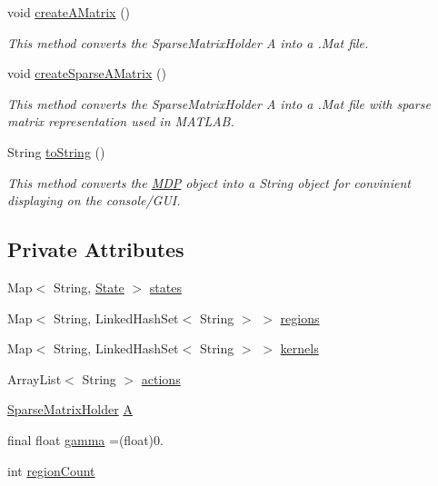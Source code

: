 \begin{DoxyCompactItemize}
void \hyperlink{classmdp_1_1core_1_1_m_d_p_aab4fc6ad8c299f88d6619cfd059b3931}{create\+A\+Matrix} ()
\begin{DoxyCompactList}\small\item\em This method converts the Sparse\+Matrix\+Holder A into a .Mat file. \end{DoxyCompactList}\item 
void \hyperlink{classmdp_1_1core_1_1_m_d_p_ab378c6028d8b83259ee5f630736d183e}{create\+Sparse\+A\+Matrix} ()
\begin{DoxyCompactList}\small\item\em This method converts the Sparse\+Matrix\+Holder A into a .Mat file with sparse matrix representation used in M\+A\+T\+L\+A\+B. \end{DoxyCompactList}\item 
String \hyperlink{classmdp_1_1core_1_1_m_d_p_aeeeba49692fd6972b6833f511e07621b}{to\+String} ()
\begin{DoxyCompactList}\small\item\em This method converts the \hyperlink{classmdp_1_1core_1_1_m_d_p}{M\+D\+P} object into a String object for convinient displaying on the console/\+G\+U\+I. \end{DoxyCompactList}\end{DoxyCompactItemize}
\subsection*{Private Attributes}
\begin{DoxyCompactItemize}
\item 
Map$<$ String, \hyperlink{classmdp_1_1core_1_1_state}{State} $>$ \hyperlink{classmdp_1_1core_1_1_m_d_p_a62bf7674d88162db7d00cfd82603b24f}{states}
\item 
Map$<$ String, Linked\+Hash\+Set$<$ String $>$ $>$ \hyperlink{classmdp_1_1core_1_1_m_d_p_a79761e7b3bb0d7a083bee7183c992893}{regions}
\item 
Map$<$ String, Linked\+Hash\+Set$<$ String $>$ $>$ \hyperlink{classmdp_1_1core_1_1_m_d_p_ac185a95b0c9eb78b9d5a00b214696191}{kernels}
\item 
Array\+List$<$ String $>$ \hyperlink{classmdp_1_1core_1_1_m_d_p_a9da06680f73a486a6ee65c8208151e70}{actions}
\item 
\hyperlink{classmdp_1_1util_1_1_sparse_matrix_holder}{Sparse\+Matrix\+Holder} \hyperlink{classmdp_1_1core_1_1_m_d_p_ac75a611d9f5186893b70b8072bfa0804}{A}
\item 
final float \hyperlink{classmdp_1_1core_1_1_m_d_p_ab240c1d97d39d6f66cff0c8d06a57a69}{gamma} =(float)0.
\item 
int \hyperlink{classmdp_1_1core_1_1_m_d_p_ae2644b9387e09a5c2ab096c0bb519f8d}{region\+Count}
\end{DoxyCompactItemize}


